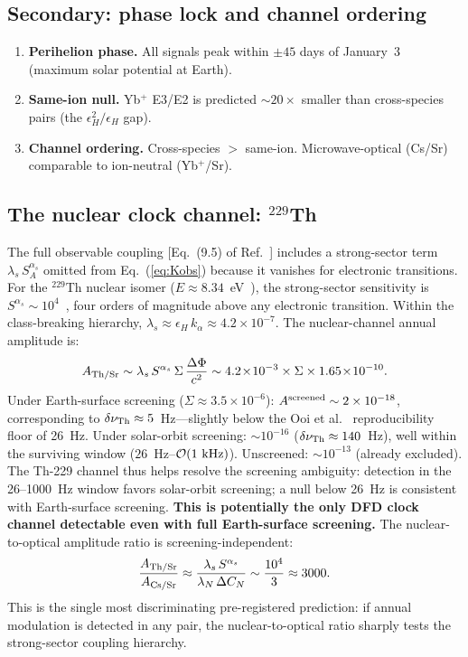 \documentclass[aps,prd,twocolumn,superscriptaddress,floatfix]{revtex4-2}
\newcommand{\kalpha}{k_\alpha}
\newcommand{\epsH}{\epsilon_H}
\begin{document}
\subsection{Secondary: phase lock and channel ordering}
\begin{enumerate}
\item \textbf{Perihelion phase.} All signals peak within $\pm 45$
  days of January~3 (maximum solar potential at Earth).
\item \textbf{Same-ion null.} Yb$^+$ E3/E2 is predicted $\sim\!20\times$
  smaller than cross-species pairs (the $\epsH^2/\epsH$ gap).
\item \textbf{Channel ordering.} Cross-species $>$ same-ion. Microwave-optical
  (Cs/Sr) comparable to ion-neutral (Yb$^+$/Sr).
\end{enumerate}
\subsection{The nuclear clock channel: $^{229}$Th}\label{sec:nuclear}
The full observable coupling [Eq.~(9.5) of
Ref.~\cite{Alcock2026DFD}] includes a strong-sector term
$\lambda_s\,S_A^{\alpha_s}$ omitted from Eq.~(\ref{eq:Kobs})
because it vanishes for electronic transitions. For the
$^{229}$Th nuclear isomer ($E \approx 8.34$~eV~\cite{Tiedau2024}),
the strong-sector sensitivity is
$S^{\alpha_s} \sim 10^4$~\cite{Flambaum2006nuclear}, four orders
of magnitude above any electronic transition.
Within the class-breaking hierarchy,
$\lambda_s \approx \epsH\,\kalpha \approx 4.2 \times 10^{-7}$.
The nuclear-channel annual amplitude is:
\begin{equation}
A_{\rm Th/Sr} \sim \lambda_s\,S^{\alpha_s}\,\Sigma\,
\frac{\Delta\Phi}{c^2}
\sim 4.2\!\times\!10^{-3}\times\Sigma\times
1.65\!\times\!10^{-10}.
\end{equation}
Under Earth-surface screening ($\Sigma \approx 3.5 \times 10^{-6}$):
$A^{\rm screened} \sim 2 \times 10^{-18}$, corresponding to
$\delta\nu_{\rm Th} \approx 5$~Hz---slightly below the Ooi
et al.~\cite{Ooi2026} reproducibility floor of 26~Hz. Under
solar-orbit screening: $\sim\!10^{-16}$ ($\delta\nu_{\rm Th}
\approx 140$~Hz), well within the surviving window
($26$~Hz--$\mathcal{O}(1~\rm kHz)$). Unscreened: $\sim\!10^{-13}$
(already excluded). The Th-229 channel thus helps resolve the
screening ambiguity: detection in the 26--1000~Hz window favors
solar-orbit screening; a null below 26~Hz is consistent with
Earth-surface screening.
\textbf{This is potentially the only DFD clock channel detectable
even with full Earth-surface screening.}
The nuclear-to-optical amplitude ratio is screening-independent:
\begin{equation}\label{eq:nuclear-ratio}
\frac{A_{\rm Th/Sr}}{A_{\rm Cs/Sr}} \approx
\frac{\lambda_s\,S^{\alpha_s}}{\lambda_N\,\Delta C_N}
\sim \frac{10^4}{3} \approx 3000.
\end{equation}
This is the single most discriminating pre-registered prediction:
if annual modulation is detected in any pair, the nuclear-to-optical
ratio sharply tests the strong-sector coupling hierarchy.
\end{document}
